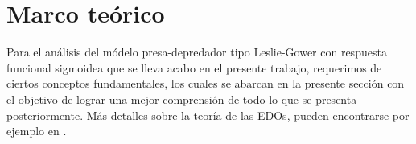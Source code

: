 \chapter{Marco teórico}

Para el análisis del módelo presa-depredador tipo Leslie-Gower con respuesta funcional sigmoidea que se lleva acabo en el presente trabajo, requerimos de ciertos conceptos fundamentales, los cuales se abarcan en la presente sección con el objetivo de lograr una mejor comprensión de todo lo que se presenta posteriormente. Más detalles sobre la teoría de las EDOs, pueden encontrarse por ejemplo en \cite{perko2001}.

%
%
%	
%	
%	
